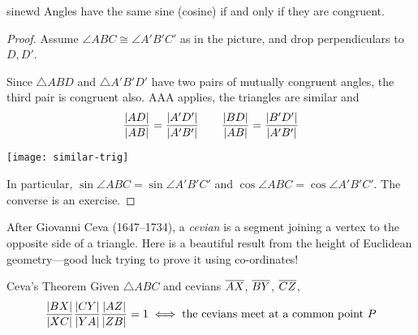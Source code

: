 \begin{thm}{}{sinewd}
	Angles have the same sine (cosine) if and only if they are congruent.
\end{thm}


\begin{proof}
	Assume $\angle ABC\cong\angle A'B'C'$ as in the picture, and drop perpendiculars to $D,D'$.\par
	\begin{minipage}[t]{0.56\linewidth}\vspace{-8pt}
		Since $\triangle ABD$ and $\triangle A'B'D'$ have two pairs of mutually congruent angles, the third pair is congruent also. AAA applies, the triangles are similar and
		\[
			\frac{\left| AD\right|}{\left| AB\right|}=\frac{\left| A'D'\right|}{\left| A'B'\right|}\qquad \frac{\left| BD\right|}{\left| AB\right|}=\frac{\left| B'D'\right|}{\left| A'B'\right|}
		\]
	\end{minipage}
	\hfill
	\begin{minipage}[t]{0.43\linewidth}\vspace{-8pt}
		\flushright
		\texttt{[image: similar-trig]}
	\end{minipage}\smallbreak
	In particular, $\sin\angle ABC=\sin\angle A'B'C'$ and $\cos\angle ABC=\cos\angle A'B'C'$.\smallbreak
	The converse is an exercise.
\end{proof}


After Giovanni Ceva (1647--1734), a \emph{cevian} is a segment joining a vertex to the opposite side of a triangle. Here is a beautiful result from the height of Euclidean geometry---good luck trying to prove it using co-ordinates!

\begin{thm}{Ceva's Theorem}{}
	Given $\triangle ABC$ and cevians $\overline{AX}$, $\overline{BY}$, $\overline{CZ}$,
	\[
		\frac{\left| BX\right|}{\left| XC\right|}\frac{\left| CY\right|}{\left| YA\right|}\frac{\left| AZ\right|}{\left| ZB\right|}=1\iff\text{the cevians meet at a common point $P$}
	\] 
\end{thm}

